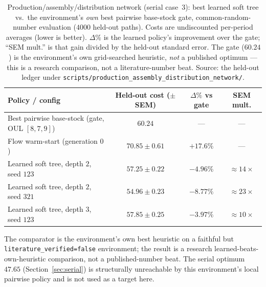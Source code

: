 \begin{table}[!htbp]
\centering
\small
\caption{Production/assembly/distribution network (serial case~3): best learned soft tree vs.\ the
environment's \emph{own} best pairwise base-stock gate, common-random-number evaluation ($4000$
held-out paths). Costs are undiscounted per-period averages (lower is better). $\Delta\%$ is the
learned policy's improvement over the gate; ``SEM mult.'' is that gain divided by the held-out
standard error. The gate ($60.24$) is the environment's own grid-searched heuristic, \emph{not} a
published optimum --- this is a research comparison, not a literature-number beat. Source: the
held-out ledger under \texttt{scripts/production\_assembly\_distribution\_network/}.}
\label{tab:pirhoo-results}
\begin{tabular}{lccc}
\toprule
Policy / config & Held-out cost ($\pm$ SEM) & $\Delta\%$ vs gate & SEM mult. \\
\midrule
Best pairwise base-stock (gate, OUL $[8,7,9]$) & $60.24$ & --- & --- \\
Flow warm-start (generation $0$)               & $70.85\pm0.61$ & $+17.6\%$ & --- \\
Learned soft tree, depth $2$, seed $123$       & $\mathbf{57.25\pm0.22}$ & $\mathbf{-4.96\%}$ & $\approx 14\times$ \\
Learned soft tree, depth $2$, seed $321$       & $\mathbf{54.96\pm0.23}$ & $\mathbf{-8.77\%}$ & $\approx 23\times$ \\
Learned soft tree, depth $3$, seed $123$       & $\mathbf{57.85\pm0.25}$ & $\mathbf{-3.97\%}$ & $\approx 10\times$ \\
\bottomrule
\end{tabular}
\par\medskip\footnotesize The comparator is the environment's own best heuristic on a faithful but
\texttt{literature\_verified=false} environment; the result is a research learned-beats-own-heuristic
comparison, not a published-number beat. The serial optimum $47.65$ (Section~\ref{sec:serial}) is
structurally unreachable by this environment's local pairwise policy and is not used as a target here.
\end{table}
\FloatBarrier
